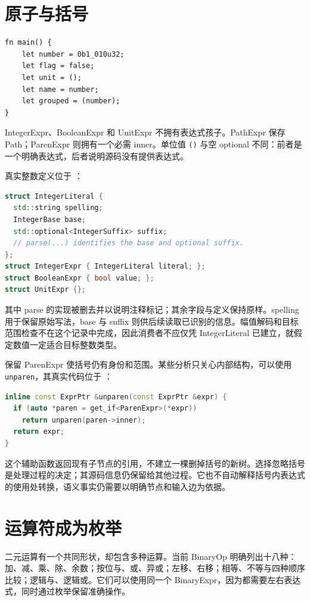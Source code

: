 \section{原子与括号}
\begin{lstlisting}[language=Rustless]
fn main() {
    let number = 0b1_010u32;
    let flag = false;
    let unit = ();
    let name = number;
    let grouped = (number);
}
\end{lstlisting}
IntegerExpr、BooleanExpr 和 UnitExpr 不拥有表达式孩子。PathExpr 保存 Path；ParenExpr 则拥有一个必需 inner。单位值 \texttt{()} 与空 optional 不同：前者是一个明确表达式，后者说明源码没有提供表达式。

真实整数定义位于 ：
\begin{lstlisting}[language=C++]
struct IntegerLiteral {
  std::string spelling;
  IntegerBase base;
  std::optional<IntegerSuffix> suffix;
  // parse(...) identifies the base and optional suffix.
};
struct IntegerExpr { IntegerLiteral literal; };
struct BooleanExpr { bool value; };
struct UnitExpr {};
\end{lstlisting}
其中 parse 的实现被删去并以说明注释标记；其余字段与定义保持原样。spelling 用于保留原始写法，base 与 suffix 则供后续读取已识别的信息。幅值解码和目标范围检查不在这个记录中完成，因此消费者不应仅凭 IntegerLiteral 已建立，就假定数值一定适合目标整数类型。

保留 ParenExpr 使括号仍有身份和范围。某些分析只关心内部结构，可以使用 \texttt{unparen}，其真实代码位于 ：
\begin{lstlisting}[language=C++]
inline const ExprPtr &unparen(const ExprPtr &expr) {
  if (auto *paren = get_if<ParenExpr>(*expr))
    return unparen(paren->inner);
  return expr;
}
\end{lstlisting}
这个辅助函数返回现有子节点的引用，不建立一棵删掉括号的新树。选择忽略括号是处理过程的决定；其源码信息仍保留给其他过程。它也不自动解释括号内表达式的使用处转换，语义事实仍需要以明确节点和输入边为依据。

\section{运算符成为枚举}
二元运算有一个共同形状，却包含多种运算。当前 BinaryOp 明确列出十八种：加、减、乘、除、余数；按位与、或、异或；左移、右移；相等、不等与四种顺序比较；逻辑与、逻辑或。它们可以使用同一个 BinaryExpr，因为都需要左右表达式，同时通过枚举保留准确操作。

